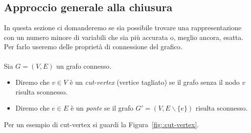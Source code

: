 \subsection{Approccio generale alla chiusura}
In questa sezione ci domanderemo se sia possibile trovare una rappresentazione con un numero minore di variabili che sia pi\`u accurata o,  meglio ancora, esatta.  Per farlo useremo delle propriet\`a di connessione del grafico.\\ \\
Sia $G=(V,E)$ un grafo connesso.
\begin{itemize}
\item Diremo che $v\in V$ \`e un \textit{cut-vertex} (vertice tagliato) se il grafo senza il nodo $v$ risulta sconnesso.
\item Diremo che $e\in E$ \`e un \textit{ponte} se il grafo $G'=(V, E\backslash\{e\})$ risulta sconnesso.
\end{itemize}
Per un esempio di cut-vertex si guardi la Figura~\ref{fig::cut-vertex}.\newpage

